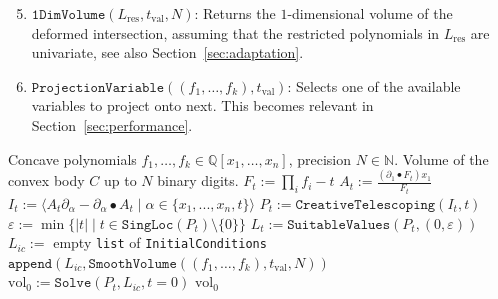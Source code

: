 \documentclass[sigconf, nonacm]{acmart} %
\newcommand{\val}[0]{{\operatorname{val}}}
\begin{document}
 \begin{enumerate}
    \setcounter{enumi}{4}
     \item $\texttt{1DimVolume}(L_{\operatorname{res}}, t_\val, N)$: Returns the $1$-dimensional volume of the deformed intersection, assuming that the restricted polynomials in $L_{\operatorname{res}}$ are univariate, see also Section~\ref{sec:adaptation}.
 \end{enumerate}
 \begin{enumerate}
    \setcounter{enumi}{5}
     \item $\texttt{ProjectionVariable}((f_1,\ldots,f_k), t_{\val})$: Selects one of the available variables to project onto next. This becomes relevant in Section~\ref{sec:performance}.
 \end{enumerate}

\begin{algorithm}[H]
    \caption{\texttt{VolumeSemialgebraic}} \label{alg:volume2}
    \begin{algorithmic} 
    \smallskip
        \Require Concave polynomials $f_1, \ldots, f_k \in \mathbb Q [x_1, \dots, x_n]$, precision $N \in \mathbb N$.
        \Ensure Volume of the convex body $C$ up to $N$ binary digits.
        \State $F_t:= \prod_i f_i - t$
        \State $A_t := \frac{(\partial_{1}\bullet F_t)x_1}{F_t}$
        \State $I_t := \langle A_t \partial_\alpha - \partial_\alpha \bullet A_t \mid \alpha \in \{x_1,...,x_n,t\} \rangle$ 
        \State $P_t :=  \texttt{CreativeTelescoping}(I_t, t)$
        \State $\varepsilon := \min \{|t| \mid t \in \texttt{SingLoc}(P_t)\setminus\{0\}\}$
        \State $L_t :=\texttt{SuitableValues}(P_t, (0,\varepsilon))$
        \State $L_{ic}:=$ empty \texttt{list} of \texttt{InitialConditions} 
        \For{$t_{\val} \in L_t$}
            \State $\texttt{append}(L_{ic}, \texttt{SmoothVolume}((f_1,\ldots, f_k), t_{\val}, N))$
        \EndFor
        \State $\operatorname{vol_0} := \texttt{Solve}(P_t, L_{ic},t = 0)$
        \State \Return $\operatorname{vol_0}$
    \end{algorithmic}
\end{algorithm}
\end{document}

